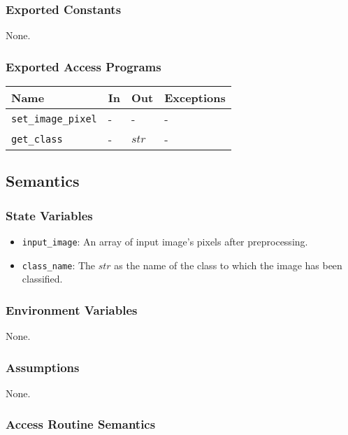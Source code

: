 \documentclass[12pt, titlepage]{article}
\def\code#1{\texttt{#1}}
\begin{document}
\subsubsection{Exported Constants}
None.

\subsubsection{Exported Access Programs}

\begin{center}
\begin{tabular}{p{3cm} p{4cm} p{4cm} p{2cm}}
\hline
\textbf{Name} & \textbf{In} & \textbf{Out} & \textbf{Exceptions} \\
\hline
\code{set\_image\_pixel} & - & - & - \\
\code{get\_class} & - & $str$&  -\\
\hline
\end{tabular}
\end{center}

\subsection{Semantics}

\subsubsection{State Variables}
\begin{itemize}
  \item \code{input\_image}: An array of input image's pixels after preprocessing.
  \item \code{class\_name}: The $str$ as the name of the class to which the image has been classified.
\end{itemize}

\subsubsection{Environment Variables}
None.

\subsubsection{Assumptions}
None.

\subsubsection{Access Routine Semantics}
\end{document}
